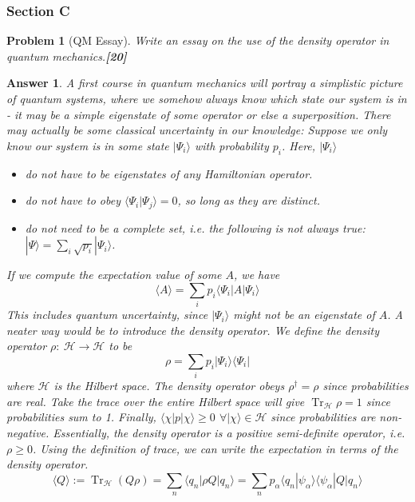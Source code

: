 \documentclass[a4paper]{article}
\DeclareMathOperator{\Tr}{Tr}
\newtheorem{ans}{Answer}[subsection]
\theoremstyle{new}
\newtheorem{qns}{Problem}[subsection]
\begin{document}
\subsubsection{Section C}
\begin{qns}[QM Essay]
Write an essay on the use of the density operator in quantum mechanics.\hfill\textbf{[20]}
\end{qns}
\begin{ans}
A first course in quantum mechanics will portray a simplistic picture of quantum systems, where we somehow always know which state our system is in - it may be a simple eigenstate of some operator or else a superposition. There may actually be some classical uncertainty in our knowledge: Suppose we only know our system is in some state $|\Psi_i\rangle$ with probability $p_i$. Here, $|\Psi_i\rangle$
\begin{itemize}
\item do not have to be eigenstates of any Hamiltonian operator.
\item do not have to obey $\langle\Psi_i|\Psi_j\rangle=0$, so long as they are distinct.
\item do not need to be a complete set, i.e. the following is not always true: $|\Psi\rangle=\sum_i\sqrt{p_i}|\Psi_i\rangle$. 
\end{itemize}
If we compute the expectation value of some $A$, we have
$$\langle A\rangle=\sum_ip_i\langle\Psi_i|A|\Psi_i\rangle$$
This includes quantum uncertainty, since $|\Psi_i\rangle$ might not be an eigenstate of $A$. A neater way would be to introduce the density operator. We define the density operator $\rho:~\mathcal{H}\rightarrow\mathcal{H}$ to be
$$\rho=\sum_ip_i|\Psi_i\rangle\langle\Psi_i|$$
where $\mathcal{H}$ is the Hilbert space. The density operator obeys $\rho^\dag=\rho$ since probabilities are real. Take the trace over the entire Hilbert space will give $\Tr_{\mathcal{H}}\rho=1$ since probabilities sum to 1. Finally, $\langle\chi|p|\chi\rangle\geq0$ $\forall|\chi\rangle\in\mathcal{H}$ since probabilities are non-negative. Essentially, the density operator is a positive semi-definite operator, i.e. $\rho\geq0$. Using the definition of trace, we can write the expectation in terms of the density operator.
$$\langle Q\rangle:=\Tr_{\mathcal{H}}(Q\rho)=\sum_n\langle q_n|\rho Q|q_n\rangle=\sum_np_\alpha\langle q_n|\psi_\alpha\rangle\langle\psi_\alpha|Q|q_n\rangle$$

\end{ans}
\end{document}
